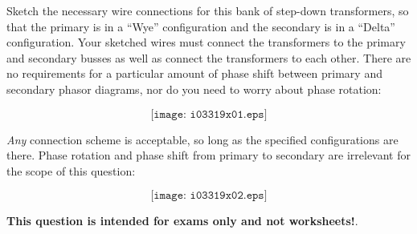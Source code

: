 

Sketch the necessary wire connections for this bank of step-down transformers, so that the primary is in a ``Wye'' configuration and the secondary is in a ``Delta'' configuration.  Your sketched wires must connect the transformers to the primary and secondary busses as well as connect the transformers to each other.  There are no requirements for a particular amount of phase shift between primary and secondary phasor diagrams, nor do you need to worry about phase rotation:

$$\texttt{[image: i03319x01.eps]}$$







{\it Any} connection scheme is acceptable, so long as the specified configurations are there.  Phase rotation and phase shift from primary to secondary are irrelevant for the scope of this question:

$$\texttt{[image: i03319x02.eps]}$$







{\bf This question is intended for exams only and not worksheets!}.



